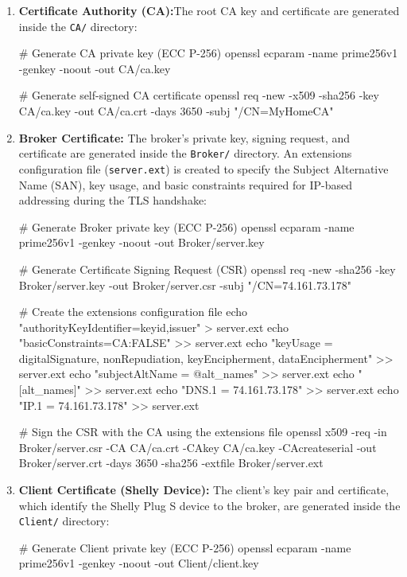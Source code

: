 \begin{enumerate}
    \item \textbf{Certificate Authority (CA):}The root CA key and certificate are generated inside the \texttt{CA/} directory:

\begin{bashcode}
# Generate CA private key (ECC P-256)
openssl ecparam -name prime256v1 -genkey -noout -out CA/ca.key

# Generate self-signed CA certificate
openssl req -new -x509 -sha256 -key CA/ca.key -out CA/ca.crt -days 3650 -subj "/CN=MyHomeCA"
\end{bashcode}

    \item \textbf{Broker Certificate:} The broker's private key, signing request, and certificate are generated inside the \texttt{Broker/} directory. An extensions configuration file (\texttt{server.ext}) is created to specify the Subject Alternative Name (SAN), key usage, and basic constraints required for IP-based addressing during the TLS handshake:

\begin{bashcode}
# Generate Broker private key (ECC P-256)
openssl ecparam -name prime256v1 -genkey -noout -out Broker/server.key

# Generate Certificate Signing Request (CSR)
openssl req -new -sha256 -key Broker/server.key -out Broker/server.csr -subj "/CN=74.161.73.178"

# Create the extensions configuration file
echo "authorityKeyIdentifier=keyid,issuer" > server.ext
echo "basicConstraints=CA:FALSE" >> server.ext
echo "keyUsage = digitalSignature, nonRepudiation, keyEncipherment, dataEncipherment" >> server.ext
echo "subjectAltName = @alt_names" >> server.ext
echo "[alt_names]" >> server.ext
echo "DNS.1 = 74.161.73.178" >> server.ext
echo "IP.1 = 74.161.73.178" >> server.ext

# Sign the CSR with the CA using the extensions file
openssl x509 -req -in Broker/server.csr -CA CA/ca.crt -CAkey CA/ca.key -CAcreateserial -out Broker/server.crt -days 3650 -sha256 -extfile Broker/server.ext
\end{bashcode}

    \item \textbf{Client Certificate (Shelly Device):} The client's key pair and certificate, which identify the Shelly Plug S device to the broker, are generated inside the \texttt{Client/} directory:

\begin{bashcode}
# Generate Client private key (ECC P-256)
openssl ecparam -name prime256v1 -genkey -noout -out Client/client.key


\end{bashcode}
\end{enumerate}
